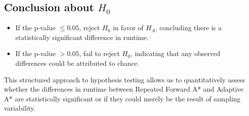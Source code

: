 \documentclass{article}
\begin{document}
\subsection{Conclusion about \(H_0\)}
\begin{itemize}
    \item If the p-value \(\leq 0.05\), reject \(H_0\) in favor of \(H_A\), concluding there is a statistically significant difference in runtime.
    \item If the p-value \(> 0.05\), fail to reject \(H_0\), indicating that any observed differences could be attributed to chance.
\end{itemize}

This structured approach to hypothesis testing allows us to quantitatively assess whether the differences in runtime between Repeated Forward A* and Adaptive A* are statistically significant or if they could merely be the result of sampling variability.
\end{document}
